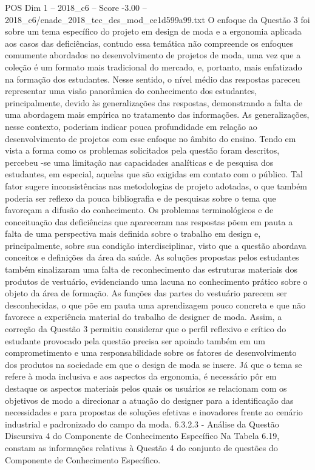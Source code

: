 \begin{textsample}{POS Dim 1 – 2018\_c6 – Score -3.00 – 2018\_c6/enade\_2018\_tec\_des\_mod\_ce1d599a99.txt}
O enfoque da Questão 3 foi sobre um tema específico do projeto em design de moda e a ergonomia aplicada aos casos das deficiências, contudo essa temática não compreende os enfoques comumente abordados no desenvolvimento de projetos de moda, uma vez que a coleção é um formato mais tradicional do mercado, e, portanto, mais enfatizado na formação dos estudantes.
Nesse sentido, o nível médio das respostas pareceu representar uma visão panorâmica do conhecimento dos estudantes, principalmente, devido às generalizações das respostas, demonstrando a falta de uma abordagem mais empírica no tratamento das informações.
As generalizações, nesse contexto, poderiam indicar pouca profundidade em relação ao desenvolvimento de projetos com esse enfoque no âmbito do ensino.
Tendo em vista a forma como os problemas solicitados pela questão foram descritos, percebeu -se uma limitação nas capacidades analíticas e de pesquisa dos estudantes, em especial, aquelas que são exigidas em contato com o público.
Tal fator sugere inconsistências nas metodologias de projeto adotadas, o que também poderia ser reflexo da pouca bibliografia e de pesquisas sobre o tema que favoreçam a difusão do conhecimento.
Os problemas terminológicos e de conceituação das deficiências que apareceram nas respostas põem em pauta a falta de uma perspectiva mais definida sobre o trabalho em design e, principalmente, sobre sua condição interdisciplinar, visto que a questão abordava conceitos e definições da área da saúde.
As soluções propostas pelos estudantes também sinalizaram uma falta de reconhecimento das estruturas materiais dos produtos de vestuário, evidenciando uma lacuna no conhecimento prático sobre o objeto da área de formação.
As funções das partes do vestuário parecem ser desconhecidas, o que põe em pauta uma aprendizagem pouco concreta e que não favorece a experiência material do trabalho de designer de moda.
Assim, a correção da Questão 3 permitiu considerar que o perfil reflexivo e crítico do estudante provocado pela questão precisa ser apoiado também em um comprometimento e uma responsabilidade sobre os fatores de desenvolvimento dos produtos na sociedade em que o design de moda se insere.
Já que o tema se refere à moda inclusiva e aos aspectos da ergonomia, é necessário pôr em destaque os aspectos materiais pelos quais os usuários se relacionam com os objetivos de modo a direcionar a atuação do designer para a identificação das necessidades e para propostas de soluções efetivas e inovadores frente ao cenário industrial e padronizado do campo da moda. 6.3.2.3 - Análise da Questão Discursiva 4 do Componente de Conhecimento Específico Na Tabela 6.19, constam as informações relativas à Questão 4 do conjunto de questões do Componente de Conhecimento Específico.

\end{textsample}
